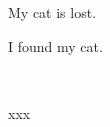 \chapter*{}
\setmainfont{Times New Roman}

My cat is lost.

I found my cat.

~~

\noindent
{}
{
    xxx
}

